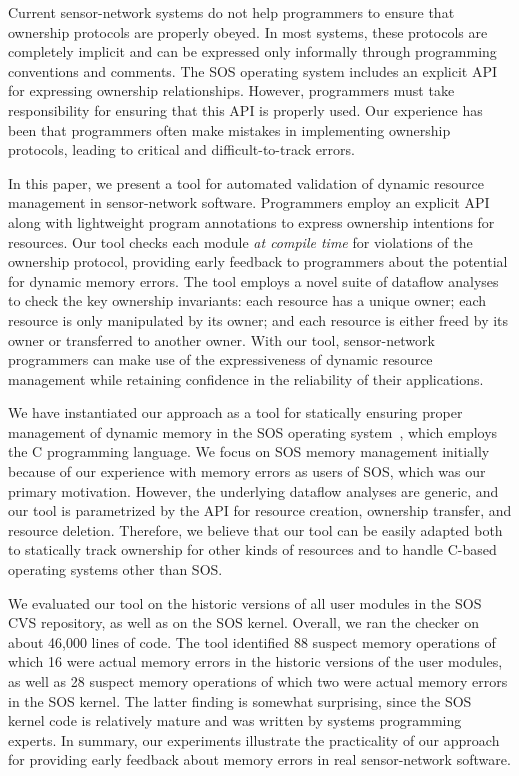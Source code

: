 Current sensor-network systems do not help programmers to ensure that
ownership protocols are properly obeyed.  In most systems, these
protocols are completely implicit and can be expressed only informally
through programming conventions and comments.  The SOS operating
system includes an explicit API for expressing ownership
relationships.  However, programmers must take responsibility for
ensuring that this API is properly used.  Our experience has been that
programmers often make mistakes in implementing ownership protocols,
leading to critical and difficult-to-track errors.  

In this paper, we present a tool for automated validation of dynamic
resource management in sensor-network software.  Programmers employ an
explicit API along with lightweight program annotations to express
ownership intentions for resources.  Our tool checks each module {\em
at compile time} for violations of the ownership protocol, providing
early feedback to programmers about the potential for dynamic memory
errors.  The tool employs a novel suite of dataflow analyses to check
the key ownership invariants:  each resource has a unique owner; each
resource is only manipulated by its owner; and each resource is either
freed by its owner or transferred to another owner.  With our tool,
sensor-network programmers can make use of the expressiveness of
dynamic resource management while retaining confidence in the
reliability of their applications.

We have instantiated our approach as a tool for statically ensuring
proper management of dynamic memory in the SOS operating
system~\cite{sos}, which employs the C programming language.  We focus
on SOS memory management initially because of our experience with
memory errors as users of SOS, which was our primary motivation.
However, the underlying dataflow analyses are generic, and our tool is
parametrized by the API for resource creation, ownership transfer, and
resource deletion.  Therefore, we believe that our tool can be easily
adapted both to statically track ownership for other kinds of
resources and to handle C-based operating systems other than SOS.

We evaluated our tool on the historic versions of all user modules in
the SOS CVS repository, as well as on the SOS kernel.  Overall, we ran
the checker on about 46,000 lines of code.  The tool identified 88
suspect memory operations of which 16 were actual memory errors in the
historic versions of the user modules, as well as 28 suspect memory
operations of which two were actual memory errors in the SOS kernel.
The latter finding is somewhat surprising, since the SOS kernel code
is relatively mature and was written by systems programming experts.
In summary, our experiments illustrate the practicality of our
approach for providing early feedback about memory errors in real
sensor-network software.

